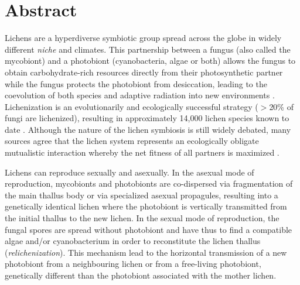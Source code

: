 \documentclass[runningheads,a4paper]{llncs}
\begin{document}
\section*{Abstract}
Lichens are a hyperdiverse symbiotic group spread across the globe in widely different {\em niche} and climates. This partnership between a fungus (also called the mycobiont) and a photobiont (cyanobacteria, algae or both) allows the fungus to obtain carbohydrate-rich resources directly from their photosynthetic partner \cite{lutzoni2009lichens} while the fungus protects the photobiont from desiccation, leading to the coevolution of both species and adaptive radiation into new environments \cite{nash1996lichen}. Lichenization is an evolutionarily and ecologically successful strategy ($>$20\% of fungi are lichenized), resulting in approximately 14,000 lichen species known to date \cite{lutzoni2009lichens,honegger1998lichen}. Although the nature of the lichen symbiosis is still widely debated, many sources agree that the lichen system represents an ecologically obligate mutualistic interaction whereby the net fitness of all partners is maximized \cite{bronstein1994our,honegger1998lichen}.


Lichens can reproduce sexually and asexually. In the asexual mode of reproduction, mycobionts and photobionts are co-dispersed via fragmentation of the main thallus body or via specialized asexual propagules, resulting into a genetically identical lichen where the photobiont is vertically transmitted from the initial thallus to the new lichen. 
In the sexual mode of reproduction, the fungal spores are spread without photobiont and have thus to find a compatible algae and/or cyanobacterium in order to reconstitute the lichen thallus (\emph{relichenization}). This mechanism lead to the horizontal transmission of a new photobiont from a neighbouring lichen or from a free-living photobiont, genetically different than the photobiont associated with the mother lichen. 
\end{document}
